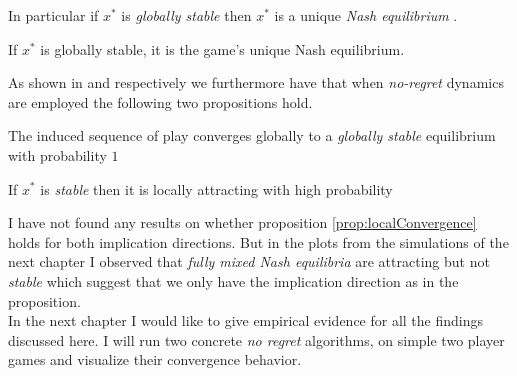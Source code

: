 In particular if $x^*$ is \textit{globally stable} then $x^*$ is a unique \textit{Nash equilibrium} \cite[Prop.2.5]{mertikopoulos}.

\begin{proposition}\label{prop:GloballyStableUniqueNE}
    If $x^*$ is globally stable, it is the game’s unique Nash equilibrium.
\end{proposition}

As shown in \cite[Theorem 4.7]{mertikopoulos} and \cite[Theorem 4.11]{mertikopoulos} respectively we furthermore have that when \textit{no-regret} dynamics are employed the following two propositions hold.

\begin{proposition}\label{prop:globalConvergence}
    The induced sequence of play converges globally to a \textit{globally stable} equilibrium with probability $1$
\end{proposition}

\begin{proposition}\label{prop:localConvergence}
    If $x^*$ is \textit{stable} then it is locally attracting with high probability
\end{proposition}

I have not found any results on whether proposition \ref{prop:localConvergence} holds for both implication directions. But in the plots from the simulations of the next chapter I observed that \textit{fully mixed Nash equilibria} are attracting but not \textit{stable} which suggest that we only have the implication direction as in the proposition. \\

In the next chapter I would like to give empirical evidence for all the findings discussed here. I will run two concrete \textit{no regret} algorithms, on simple two player games and visualize their convergence behavior. 
